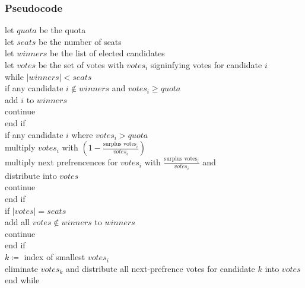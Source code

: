\subsubsection{Pseudocode}
\label{Stv psuedocode}
let $quota$ be the quota \\
let $seats$ be the number of seats \\
let $winners$ be the list of elected candidates \\
let $votes$ be the set of votes with $votes_{i}$ signinfying votes for candidate $i$\\
while $\left\vert{winners}\right\vert < seats$\\
\tab if any candidate $i \notin winners$ and $votes_{i} \geq quota$ \\
\tab\tab add $i$ to $winners$ \\
\tab\tab continue \\
\tab end if \\
\tab if any candidate $i$ where $votes_{i} > quota$\\
\tab\tab multiply $votes_{i}$ with $(1 - \frac{\text{surplus votes}_{i}}{votes_{i}})$ \\
\tab\tab multiply next prefrencences for $votes_{i}$ with $\frac{\text{surplus votes}_{i}}{votes_{i}}$ and \\ \tab\tab distribute into $votes$\\
\tab\tab continue \\
\tab end if \\
\tab if $\left\vert{votes}\right\vert = seats$ \\
\tab\tab add all $votes \notin winners$ to $winners$ \\
\tab\tab continue \\
\tab end if \\
\tab $k \coloneqq$ index of smallest $votes_{i}$ \\
\tab eliminate $votes_{k}$ and distribute all next-prefrence votes for candidate $k$ \tab into $votes$\\
end while
